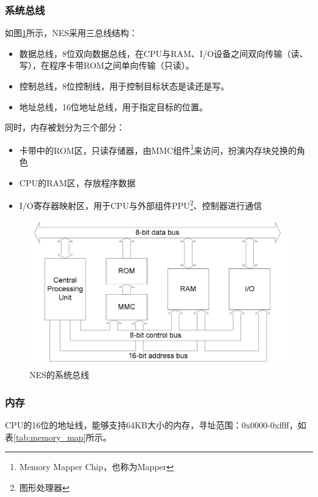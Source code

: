 \documentclass[a4paper]{ltxdoc}
\begin{document}
{\subsubsection{系统总线}
如图\ref{fig:system_bus}所示，NES采用三总线结构：
\begin{itemize}
	\item 数据总线，8位双向数据总线，在CPU与RAM、I/O设备之间双向传输（读、写），在程序卡带ROM之间单向传输（只读）。
	\item 控制总线，8位控制线，用于控制目标状态是读还是写。
	\item 地址总线，16位地址总线，用于指定目标的位置。
\end{itemize}

同时，内存被划分为三个部分：
\begin{itemize}
	\item 卡带中的ROM区，只读存储器，由MMC组件\footnote{Memory Mapper Chip，也称为Mapper}来访问，扮演内存块兑换的角色
	\item CPU的RAM区，存放程序数据
	\item I/O寄存器映射区，用于CPU与外部组件PPU\footnote{图形处理器}、控制器进行通信
\end{itemize}

\begin{figure}[h]
	\centering
	\includegraphics[width=\textwidth]{images/system_bus.png}
	\caption{NES的系统总线}
	\label{fig:system_bus}
\end{figure}

\subsubsection{内存}
CPU的16位的地址线，能够支持64KB大小的内存，寻址范围：0x0000-0xffff，如表\ref{tab:memory_map}所示。

}
\end{document}
